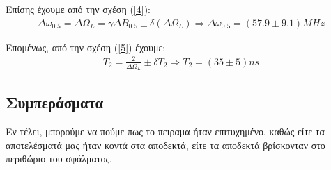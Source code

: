 \documentclass[a4paper]{article}
\begin{document}
		Επίσης έχουμε από την σχέση (\ref{4})\footnotemark :
			\begin{align*}
				\Delta\omega_{0.5} = \Delta\Omega_L = \gamma\Delta B_{0.5} \pm \delta(\Delta\Omega_L) \Rightarrow \boxed{\Delta\omega_{0.5}=(57.9 \pm 9.1)MHz}
			\end{align*}
			
			Επομένως, από την σχέση (\ref{5}) έχουμε:\footnotemark
				\begin{align*}
					T_2 = \frac{2}{\Delta\Omega_L}\pm \delta T_2 \Rightarrow \boxed{T_2 = ( 35 \pm 5)ns}
				\end{align*}
		
		\subsection{Συμπεράσματα }
			Εν τέλει, μπορούμε να πούμε πως το πειραμα ήταν επιτυχημένο, καθώς είτε τα αποτελέσματά μας ήταν κοντά στα αποδεκτά, είτε τα αποδεκτά βρίσκονταν στο περιθώριο του σφάλματος.
\end{document}
